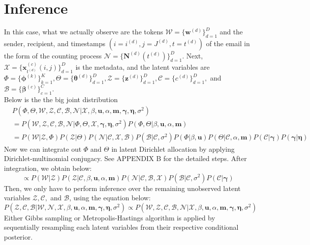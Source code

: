 \documentclass[a4paper]{article}
\begin{document}
  \section{Inference} \label{sec: Inference}
In this case, what we actually observe are the tokens $\mathcal{W}=\{\boldsymbol{w}^{(d)} \}_{d=1}^{D}$ and the sender, recipient, and timestamps $(i=i^{(d)}, j=J^{(d)}, t=t^{(d)})$ of the email in the form of the counting process $\mathcal{N}=\{\boldsymbol{N}^{(d)}(t^{(d)}) \}_{d=1}^{D}.$ Next,  $\mathcal{X}=\{\boldsymbol{x}^{(c)}_{t^{(d)}}(i, j)\}_{d=1}^{D}$ is the metadata, and the latent variables are $\Phi=\{\boldsymbol{\phi}^{(k)}\}_{k=1}^{K}, \Theta=\{\boldsymbol{\theta}^{(d)} \}_{d=1}^{D}, \mathcal{Z}=\{\boldsymbol{z}^{(d)} \}_{d=1}^{D}, \mathcal{C}=\{{c}^{(d)} \}_{d=1}^{D},$ and $\mathcal{B}=\{\boldsymbol{\beta}^{(c)} \}_{c=1}^{C}$.\\
 \newline 
 Below is the the big joint distribution
 \begin{equation}
 \begin{aligned}
 & P(\Phi, \Theta, \mathcal{W}, \mathcal{Z}, \mathcal{C}, \mathcal{B}, \mathcal{N}| \mathcal{X}, \beta, \boldsymbol{u}, \alpha, \boldsymbol{m}, \boldsymbol{\gamma}, \boldsymbol{\eta}, \sigma^2) \\& 
 =  P(\mathcal{W}, \mathcal{Z}, \mathcal{C}, \mathcal{B}, \mathcal{N}| \Phi, \Theta, \mathcal{X}, \boldsymbol{\gamma}, \boldsymbol{\eta}, \sigma^2) P(\Phi, \Theta |\beta, \boldsymbol{u}, \alpha, \boldsymbol{m})
 \\&= P( \mathcal{W}| \mathcal{Z}, \Phi)P(\mathcal{Z}|\Theta)P(\mathcal{N}|\mathcal{C}, \mathcal{X}, \mathcal{B})P(\mathcal{B}|\mathcal{C}, \sigma^2)P(\Phi|\beta, \boldsymbol{u})P(\Theta|\mathcal{C}, \alpha, \boldsymbol{m})P(\mathcal{C}|\boldsymbol{\gamma})P(\boldsymbol{\gamma}|\boldsymbol{\eta})
 \end{aligned}
 \end{equation}
 Now we can integrate out $\Phi$ and $\Theta$ in latent Dirichlet allocation by applying Dirichlet-multinomial conjugacy. See APPENDIX B for the detailed steps. After integration, we obtain below:
 \begin{equation}
 \propto P(\mathcal{W}|\mathcal{Z})P( \mathcal{Z}|\mathcal{C}, \beta, \boldsymbol{u}, \alpha, \boldsymbol{m})P(\mathcal{N}|\mathcal{C}, \mathcal{B}, \mathcal{X})P(\mathcal{B}|\mathcal{C}, \sigma^2)P(\mathcal{C}|\boldsymbol{\gamma})
 \end{equation}
 Then, we only have to perform inference over the remaining unobserved latent variables $\mathcal{Z}, \mathcal{C},$ and $\mathcal{B}$, using the equation below:
 \begin{equation}
 P( \mathcal{Z}, \mathcal{C}, \mathcal{B}|\mathcal{W}, \mathcal{N}, \mathcal{X}, \beta, \boldsymbol{u}, \alpha, \boldsymbol{m}, \boldsymbol{\gamma}, \boldsymbol{\eta}, \sigma^2) \propto P(\mathcal{W},  \mathcal{Z}, \mathcal{C}, \mathcal{B}, \mathcal{N} | \mathcal{X}, \beta, \boldsymbol{u}, \alpha, \boldsymbol{m}, \boldsymbol{\gamma}, \boldsymbol{\eta}, \sigma^2)
 \end{equation}
 Either Gibbs sampling or Metropolis-Hastings algorithm is applied by sequentially resampling each latent variables from their respective conditional posterior.
\end{document}
